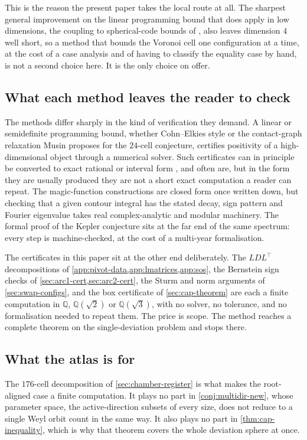 \documentclass[11pt,reqno]{amsart}
\renewcommand{\_}{\origunderscore\allowbreak}
\numberwithin{equation}{section}
\theoremstyle{plain}
\theoremstyle{definition}
\theoremstyle{remark}
\begin{document}
This is the reason the present paper takes the local route at all. The
sharpest general improvement on the linear programming bound that does
apply in low dimensions, the coupling to spherical-code bounds of
\cite{CZ14}, also leaves dimension $4$ well short, so a method that
bounds the Voronoi cell one configuration at a time, at the cost of a
case analysis and of having to classify the equality case by hand, is
not a second choice here. It is the only choice on offer.

\subsection{What each method leaves the reader to check}

The methods differ sharply in the kind of verification they demand. A
linear or semidefinite programming bound, whether Cohn--Elkies style or
the contact-graph relaxation Musin \cite{Mus18} proposes for the
$24$-cell conjecture, certifies positivity of a high-dimensional object
through a numerical solver. Such certificates can in principle be
converted to exact rational or interval form \cite{Par03,Las01}, and
often are, but in the form they are usually produced they are not a
short exact computation a reader can repeat. The magic-function
constructions are closed form once written down, but checking that a
given contour integral has the stated decay, sign pattern and Fourier
eigenvalue takes real complex-analytic and modular machinery. The
formal proof of the Kepler conjecture \cite{Hal17} sits at the far end
of the same spectrum: every step is machine-checked, at the cost of a
multi-year formalisation.

The certificates in this paper sit at the other end deliberately. The
$LDL^\top$ decompositions of
\cref{app:pivot-data,app:lmatrices,app:sos}, the Bernstein sign checks
of \cref{sec:arc1-cert,sec:arc2-cert}, the Sturm and norm arguments of
\cref{sec:swap-configs}, and the box certificate of
\cref{sec:cap-theorem} are each a finite computation in
$\mathbb{Q}$, $\mathbb{Q}(\sqrt2)$ or $\mathbb{Q}(\sqrt3)$, with no
solver, no tolerance, and no formalisation needed to repeat them. The
price is scope. The method reaches a complete theorem on the
single-deviation problem and stops there.

\subsection{What the atlas is for}

The $176$-cell decomposition of \cref{sec:chamber-register} is what
makes the root-aligned case a finite computation. It plays no part in
\cref{conj:multidir-new}, whose parameter space, the active-direction
subsets of every size, does not reduce to a single Weyl orbit count in
the same way. It also plays no part in \cref{thm:cap-inequality}, which
is why that theorem covers the whole deviation sphere at once.
\end{document}
